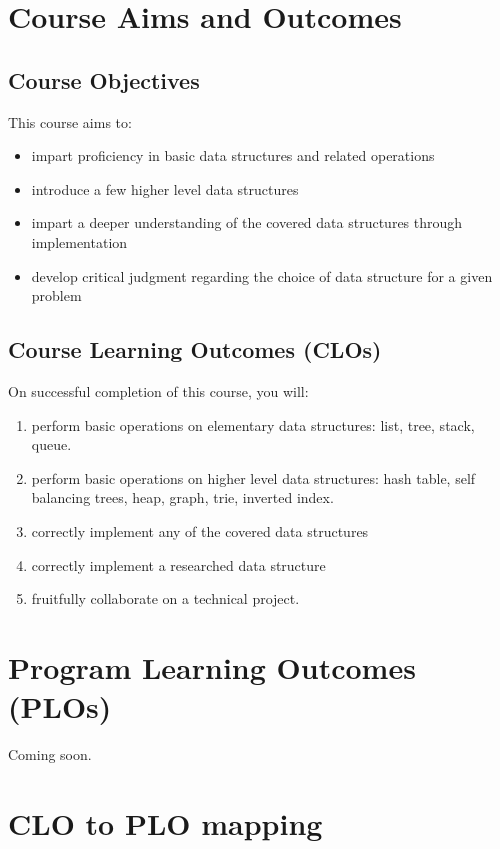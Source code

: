 \documentclass[a4paper]{article}
\begin{document}
\section{Course Aims and Outcomes}

\subsection{Course Objectives}

This course aims to:
\begin{itemize}
\item impart proficiency in basic data structures and related operations
\item introduce a few higher level data structures
\item impart a deeper understanding of the covered data structures through implementation
\item develop critical judgment regarding the choice of data structure for a given problem
\end{itemize}

\subsection{Course Learning Outcomes (CLOs)}

On successful completion of this course, you will:
\begin{enumerate}
\item perform basic operations on elementary data structures: list, tree, stack, queue.
\item perform basic operations on higher level data structures: hash table, self balancing trees, heap, graph, trie, inverted index.
\item correctly implement any of the covered data structures 
\item correctly implement a researched data structure
\item fruitfully collaborate on a technical project.
\end{enumerate}

\section{Program Learning Outcomes (PLOs) }

Coming soon.

\section{CLO to PLO mapping}
\end{document}
